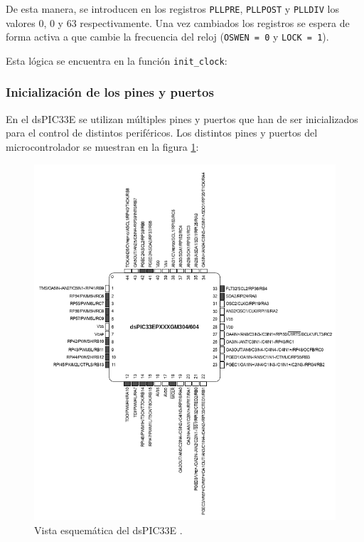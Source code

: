 De esta manera, se introducen en los registros \texttt{PLLPRE}, \texttt{PLLPOST} y
\texttt{PLLDIV} los valores $0$, $0$ y $63$ respectivamente. Una vez cambiados los
registros se espera de forma activa a que cambie la frecuencia del reloj
(\texttt{OSWEN = 0} y \texttt{LOCK = 1}).

Esta lógica se encuentra en la función \texttt{init\_clock}:


\subsubsection{Inicialización de los pines y puertos}
En el dsPIC33E se utilizan múltiples pines y puertos que han de ser inicializados para
el control de distintos periféricos. Los distintos pines y puertos del microcontrolador
se muestran en la figura \ref{fig:dspic33e_upper}:

\begin{figure}[H]
    \centering
    \includegraphics[width=\linewidth]{pictures/dspic33e_upper.png}
    \caption{Vista esquemática del dsPIC33E \cite{7759009FCCCDatasheetHoja}.}
    \label{fig:dspic33e_upper}
\end{figure}

